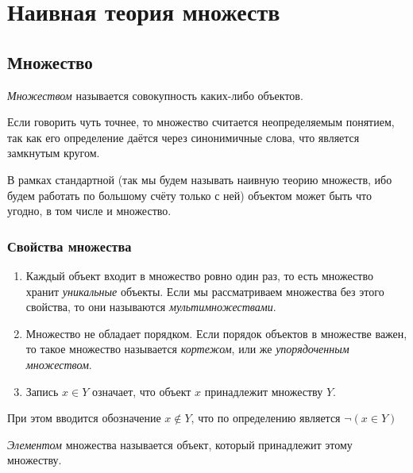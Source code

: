 \section{Наивная теория множеств}
 
\subsection{Множество}
 
\begin{definition}
    \textit{Множеством} называется совокупность каких-либо объектов.
\end{definition}
 
\begin{note}
    Если говорить чуть точнее, то множество считается неопределяемым понятием, так как его определение даётся через синонимичные слова, что является замкнутым кругом.
\end{note}
 
\begin{note}
    В рамках стандартной (так мы будем называть наивную теорию множеств, ибо будем работать по большому счёту только с ней) объектом может быть что угодно, в том числе и множество.
\end{note}
 
\subsubsection*{Свойства множества}
 
\begin{enumerate}
     \item Каждый объект входит в множество ровно один раз, то есть множество хранит \textit{уникальные} объекты. Если мы рассматриваем множества без этого свойства, то они называются \textit{мультимножествами}.
     \item Множество не обладает порядком. Если порядок объектов в множестве важен, то такое множество называется \textit{кортежом}, или же \textit{упорядоченным множеством}.
     \item Запись $x \in Y$ означает, что объект $x$ принадлежит множеству $Y$.
\end{enumerate}

\begin{note}
	При этом вводится обозначение $x \notin Y$, что по определению является $\neg (x \in Y)$
\end{note}
 
\begin{definition}
    \textit{Элементом} множества называется объект, который принадлежит этому множеству.
\end{definition}
 
